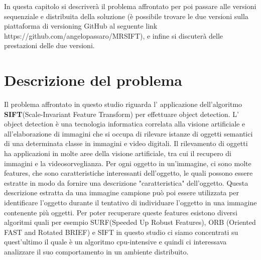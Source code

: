 In questa capitolo si descriverà il problema affrontato per poi passare alle versioni sequenziale e distribuita della soluzione (è possibile trovare le due versioni sulla piattaforma di versioning GitHub al seguente link \\ https://github.com/angelopassaro/MRSIFT), e infine si discuterà delle prestazioni delle due versioni.
\newline
\section{Descrizione del problema}

Il problema affrontato in questo studio riguarda l' applicazione dell'algoritmo \textbf{SIFT}(Scale-Invariant Feature Transform) per effettuare object detection. L' object detection è una tecnologia informatica correlata alla visione artificiale e all'elaborazione di immagini che si occupa di rilevare istanze di oggetti semantici di una determinata classe in immagini e video digitali. Il rilevamento di oggetti ha applicazioni in molte aree della visione artificiale, tra cui il recupero di immagini e la videosorveglianza. 
Per ogni oggetto in un'immagine, ci sono molte features, che sono caratteristiche interessanti dell'oggetto, le quali possono essere estratte in modo da fornire una descrizione "caratteristica" dell'oggetto. Questa descrizione estratta da una immagine campione può poi essere utilizzata per identificare l'oggetto durante il tentativo di individuare l'oggetto in una immagine contenente più oggetti. Per poter recuperare queste features esistono diversi algoritmi quali per esempio SURF(Speeded Up Robust Features), ORB (Oriented FAST and Rotated BRIEF) e SIFT in questo studio ci siamo concentrati su quest'ultimo il quale è un algoritmo cpu-intensive e quindi ci interessava analizzare il suo comportamento in un ambiente distribuito.

